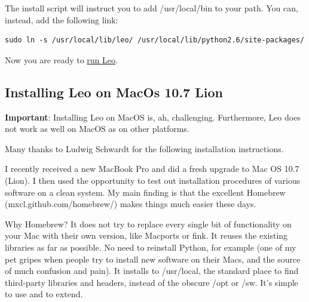 \documentclass[a4paper,10pt,english]{sphinxmanual}
\begin{document}
The install script will instruct you to add /usr/local/bin to your path.
You can, instead, add the following link:

\begin{Verbatim}[commandchars=\\\{\}]
sudo ln -s /usr/local/lib/leo/ /usr/local/lib/python2.6/site-packages/
\end{Verbatim}

Now you are ready to {\hyperref[installing:running-leo]{run Leo}}.


\subsection{Installing Leo on MacOs 10.7 Lion}
\label{installing:installing-leo-on-macos-10-7-lion}
\textbf{Important}: Installing Leo on MacOS is, ah, challenging.
Furthermore, Leo does not work as well on MacOS as on other platforms.

Many thanks to Ludwig Schwardt for the following
installation instructions.

I recently received a new MacBook Pro and did a fresh upgrade to Mac OS
10.7 (Lion). I then used the opportunity to test out installation
procedures of various software on a clean system. My main finding is that
the excellent Homebrew (mxcl.github.com/homebrew/) makes things much easier
these days.

Why Homebrew? It does not try to replace every single bit of functionality
on your Mac with their own version, like Macports or fink. It reuses the
existing libraries as far as possible. No need to reinstall Python, for
example (one of my pet gripes when people try to install new software on
their Macs, and the source of much confusion and pain). It installs to
/usr/local, the standard place to find third-party libraries and headers,
instead of the obscure /opt or /sw. It's simple to use and to extend.
\end{document}
